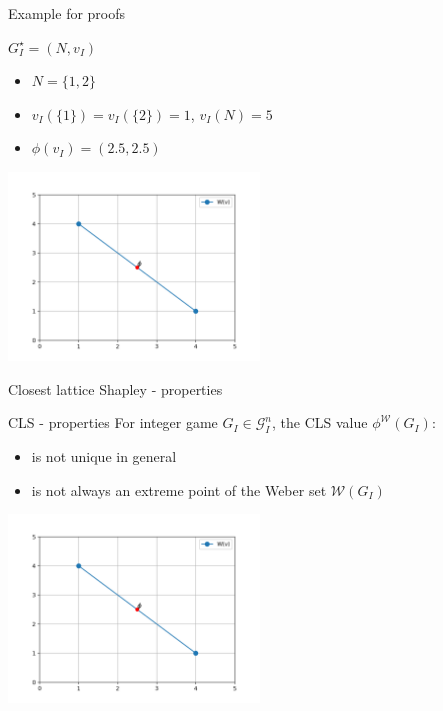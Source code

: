 \documentclass{beamer}
\begin{document}


\begin{frame}{Example for proofs}

    \begin{block}{$G_I^{\star}=(N,v_I)$}
        \pause
        \begin{itemize}
            \item $N=\{1,2\}$
            \pause
            \item $v_I(\{1\})=v_I(\{2\})=1$, $v_I(N)=5$
            \pause
            \item $\phi(v_I)=(2.5,2.5)$
        \end{itemize}
    \end{block}

    \pause

    \centering
    \includegraphics[height=5cm]{../img/figure_weber_set_example.png}
\end{frame}



\begin{frame}{Closest lattice Shapley - properties}
    \pause

    \begin{block}{CLS - properties}
        For integer game $G_I \in \mathcal{G}_I^n$, the CLS value $\phi^\mathcal{W}(G_I)$:
        \begin{itemize}
            \item is not unique in general
            \item is not always an extreme point of the Weber set $\mathcal{W}(G_I)$
        \end{itemize}
    \end{block}

    \pause

    \centering
    \includegraphics[height=5cm]{../img/figure_weber_set_example.png}
\end{frame}
\end{document}
